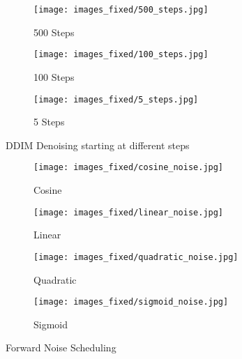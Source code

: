 \documentclass[10pt,twocolumn,letterpaper]{article}
\begin{document}
\begin{figure}
    \centering
    \begin{subfigure}[b]{0.4\textwidth}
        \centering
        \texttt{[image: images\_fixed/500\_steps.jpg]}
        \caption{500 Steps}
        \label{subfig:500steps}
    \end{subfigure}
    \hfill
    \begin{subfigure}[b]{0.4\textwidth}
        \centering
        \texttt{[image: images\_fixed/100\_steps.jpg]}
        \caption{100 Steps}
        \label{subfig:100steps}
    \end{subfigure}
    \hfill
    \begin{subfigure}[b]{0.4\textwidth}
        \centering
        \texttt{[image: images\_fixed/5\_steps.jpg]}
        \caption{5 Steps}
        \label{subfig:5steps}
    \end{subfigure}
    \caption{DDIM Denoising starting at different steps}
    \label{fig:steps}
\end{figure}
\begin{figure}
    \centering
    \begin{subfigure}[b]{0.4\textwidth}
        \centering
        \texttt{[image: images\_fixed/cosine\_noise.jpg]}
        \caption{Cosine}
        \label{subfig:cosine_noise}
    \end{subfigure}
    \hfill
    \begin{subfigure}[b]{0.4\textwidth}
        \centering
        \texttt{[image: images\_fixed/linear\_noise.jpg]}
        \caption{Linear}
        \label{subfig:linear_noise}
    \end{subfigure}
    \hfill
    \begin{subfigure}[b]{0.4\textwidth}
        \centering
        \texttt{[image: images\_fixed/quadratic\_noise.jpg]}
        \caption{Quadratic}
        \label{subfig:quadratic_noise}
    \end{subfigure}
    \hfill
    \begin{subfigure}[b]{0.4\textwidth}
        \centering
        \texttt{[image: images\_fixed/sigmoid\_noise.jpg]}
        \caption{Sigmoid}
        \label{subfig:sigmoid_noise}
    \end{subfigure}
    \caption{Forward Noise Scheduling}
    \label{fig:noise_schedules}
\end{figure}
\end{document}
